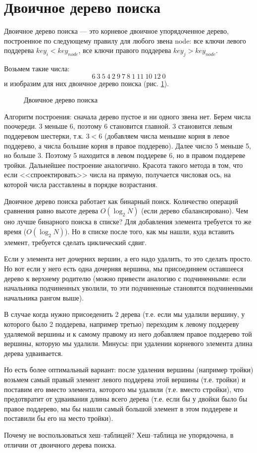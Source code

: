 \section{Двоичное дерево поиска}
\textsf{Двоичное дерево поиска} --- это корневое двоичное упорядоченное дерево, построенное по следующему правилу для любого звена node: все ключи левого поддерева $key_i<key_{node}$, все ключи правого поддерева $key_j>key_{node}$.

Возьмем такие числа:
$$
6\ 3\ 5\ 4\ 2\ 9\ 7\ 8\ 1\ 11\ 10\ 12\ 0
$$
и изобразим для них двоичное дерево поиска (рис. \ref{fig_dvderevo}).

\begin{figure}
	\centering
	\def\svgwidth{17cm} %
	
	\caption{Двоичное дерево поиска}
	\label{fig_dvderevo}
\end{figure}

Алгоритм построения: сначала дерево пустое и ни одного звена нет. Берем числа поочереди. 3 меньше 6, поэтому 6 становится главной. 3 становится левым поддеревом шестерки, т.к. $3<6$ (добавляем числа меньшие корня в левое поддерево, а числа большие корня в правое поддерево). Далее число 5 меньше 5, но больше 3. Поэтому 5 находится в левом поддереве 6, но в правом поддереве тройки. Дальнейшее построение аналогично. Красота такого метода в том, что если <<спроектировать>> числа на прямую, получается числовая ось, на которой числа расставлены в порядке возрастания.

Двоичное дерево поиска работает как бинарный поиск. Количество операций сравнения равно высоте дерева $O(\log_2N)$ (если дерево сбалансировано). Чем оно лучше бинарного поиска в списке? Для добавления элемента требуется то же время ($O(\log_2N)$). Но в списке после того, как мы нашли, куда вставить элемент, требуется сделать циклический сдвиг.

Если у элемента нет дочерних вершин, а его надо удалить, то это сделать просто. Но вот если у него есть одна дочерняя вершина, мы присоединяем оставшееся дерево к верхнему родителю (можно привести аналогию с подчиненными: если начальника подчиненных уволили, то эти подчиненные становятся подчиненными начальника рангом выше).

В случае когда нужно присоеденить 2 дерева (т.е. если мы удалили вершину, у которого было 2 поддерева, например третью) переходим к левому поддереву удаляемой вершины и к самому правому из него добавляем правое поддерево той вершины, которую мы удалили. Минусы: при удалении корневого элемента длина дерева удваивается.

Но есть более оптимальный вариант: после удаления вершины (например тройки) возьмем самый правый элемент левого поддерева этой вершины (т.е. тройки) и поставим его вместо элемента, которого мы удалили (т.е. вместо стройки), что предотвратит от удваивания длины всего дерева (т.е. если бы у двойки было бы правое поддерево, мы бы нашли самый большой элемент в этом поддереве и поставили бы его на место тройки).

Почему не воспользоваться хеш--таблицей? Хеш--таблица не упорядочена, в отличии от двоичного дерева поиска.